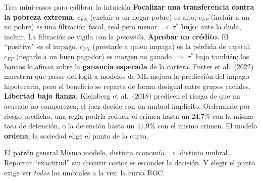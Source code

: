 \documentclass{beamer}
\newcommand{\1}{\mathbb{I}}
\begin{document}
\begin{frame}{Tres mini-casos para calibrar la intuición}
\small
\textbf{Focalizar una transferencia contra la pobreza extrema.} $c_{FN}$ (excluir a un hogar pobre) es alto; $c_{FP}$ (incluir a un no pobre) es una filtración fiscal, real pero menor $\Rightarrow$ $\tau^*$ \textbf{bajo}: ante la duda, incluir. La filtración se vigila con la \emph{precisión}.
\pause
\vspace{0.12cm}
\textbf{Aprobar un crédito.} El ``positivo'' es el impago. $c_{FN}$ (prestarle a quien impaga) es la pérdida de capital; $c_{FP}$ (negarle a un buen pagador) es margen no ganado $\Rightarrow$ $\tau^*$ bajo también; los bancos lo afinan sobre la \textbf{ganancia esperada} de la cartera. Fuster et al.\ (2022) muestran que pasar del logit a modelos de ML mejora la predicción del impago hipotecario, pero el beneficio se reparte de forma desigual entre grupos raciales.
\pause
\vspace{0.12cm}
\textbf{Libertad bajo fianza.} Kleinberg et al.\ (2018) predicen el riesgo de que un acusado no comparezca; el juez decide con un umbral implícito. Ordenando por riesgo predicho, una regla podría reducir el crimen hasta un 24,7\% con la misma tasa de detención, o la detención hasta un 41,9\% con el mismo crimen. El modelo \textbf{ordena}; la sociedad elige el punto de la curva.
\pause
\vspace{0.1cm}
\begin{block}{El patrón general}
Mismo modelo, distinta economía $\Rightarrow$ distinto umbral. Reportar ``exactitud'' sin discutir costos es esconder la decisión. Y elegir el punto exige ver \emph{todos} los umbrales a la vez: la curva ROC.
\end{block}
\end{frame}
\end{document}
